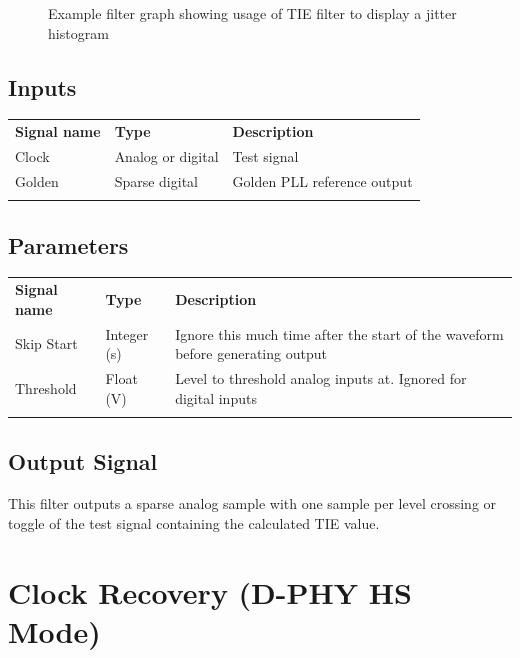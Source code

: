 \begin{figure}[h]
\centering
{}
\caption{Example filter graph showing usage of TIE filter to display a jitter histogram}
\label{filter_graph_tie}
\end{figure}

\subsection{Inputs}

\begin{tabularx}{16cm}{llX}
\thickhline
\textbf{Signal name} & \textbf{Type} & \textbf{Description} \\
\thickhline
Clock & Analog or digital & Test signal\\
\thinhline
Golden & Sparse digital & Golden PLL reference output\\
\thickhline
\end{tabularx}

\subsection{Parameters}

\begin{tabularx}{16cm}{llX}
\thickhline
\textbf{Signal name} & \textbf{Type} & \textbf{Description} \\
\thickhline
Skip Start & Integer (s) & Ignore this much time after the start of the waveform before generating output\\
\thinhline
Threshold & Float (V) & Level to threshold analog inputs at. Ignored for digital inputs\\
\thickhline
\end{tabularx}

\subsection{Output Signal}

This filter outputs a sparse analog sample with one sample per level crossing or toggle of the test signal containing
the calculated TIE value.

\pagebreak
\section{Clock Recovery (D-PHY HS Mode)}

